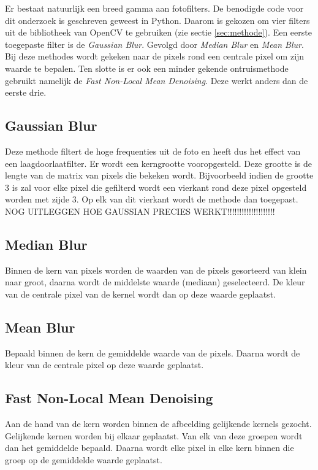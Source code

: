 Er bestaat natuurlijk een breed gamma aan fotofilters. De benodigde code voor dit onderzoek is geschreven geweest in Python. Daarom is gekozen om vier filters uit de bibliotheek van OpenCV te gebruiken (zie sectie \ref{sec:methode}).  Een eerste toegepaste filter is de \textit{Gaussian Blur}. Gevolgd door \textit{Median Blur} en \textit{Mean Blur}. Bij deze methodes wordt gekeken naar de pixels rond een centrale pixel om zijn waarde te bepalen. Ten slotte is er ook een minder gekende ontruismethode gebruikt namelijk de \textit{Fast Non-Local Mean Denoising}. Deze werkt anders dan de eerste drie.

\subsection{Gaussian Blur}
Deze methode filtert de hoge frequenties uit de foto en heeft dus het effect van een laagdoorlaatfilter. Er wordt een kerngrootte vooropgesteld. Deze grootte is de lengte van de matrix van pixels die bekeken wordt. Bijvoorbeeld indien de grootte 3 is zal voor elke pixel die gefilterd wordt een vierkant rond deze pixel opgesteld worden met zijde 3. Op elk van dit vierkant wordt de methode dan toegepast. NOG UITLEGGEN HOE GAUSSIAN PRECIES WERKT!!!!!!!!!!!!!!!!!!!!

\subsection{Median Blur}
Binnen de kern van pixels worden de waarden van de pixels gesorteerd van klein naar groot, daarna wordt de middelste waarde (mediaan) geselecteerd. De kleur van de centrale pixel van de kernel wordt dan op deze waarde geplaatst.

\subsection{Mean Blur}
Bepaald binnen de kern de gemiddelde waarde van de pixels. Daarna wordt de kleur van de centrale pixel op deze waarde geplaatst.

\subsection{Fast Non-Local Mean Denoising}
Aan  de hand van de kern worden binnen de afbeelding gelijkende kernels gezocht. Gelijkende kernen worden bij elkaar geplaatst. Van elk van deze groepen wordt dan het gemiddelde bepaald. Daarna wordt elke pixel in elke kern binnen die groep op de gemiddelde waarde geplaatst. 